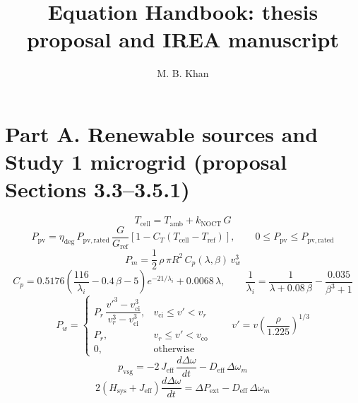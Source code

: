 \documentclass[11pt]{article}
\title{Equation Handbook: thesis proposal and IREA manuscript}
\author{M. B. Khan}
\date{}
\begin{document}
\maketitle
\section*{Part A. Renewable sources and Study 1 microgrid (proposal Sections 3.3--3.5.1)}
\begin{equation}
T_{\mathrm{cell}} = T_{\mathrm{amb}} + k_{\mathrm{NOCT}}\,G \tag{3.1}
\end{equation}
\begin{equation}
P_{\mathrm{pv}} = \eta_{\mathrm{deg}}\,P_{\mathrm{pv,rated}}\,\frac{G}{G_{\mathrm{ref}}}\left[1 - C_T\left(T_{\mathrm{cell}} - T_{\mathrm{ref}}\right)\right], \qquad 0 \le P_{\mathrm{pv}} \le P_{\mathrm{pv,rated}} \tag{3.2}
\end{equation}
\begin{equation}
P_m = \frac{1}{2}\,\rho\,\pi R^{2}\,C_p(\lambda,\beta)\,v_w^{3} \tag{3.3}
\end{equation}
\begin{equation}
C_p = 0.5176\left(\frac{116}{\lambda_i} - 0.4\,\beta - 5\right)e^{-21/\lambda_i} + 0.0068\,\lambda, \qquad \frac{1}{\lambda_i} = \frac{1}{\lambda + 0.08\,\beta} - \frac{0.035}{\beta^{3} + 1} \tag{3.4}
\end{equation}
\begin{equation}
P_w = \begin{cases} P_r\,\dfrac{v'^{3} - v_{\mathrm{ci}}^{3}}{v_r^{3} - v_{\mathrm{ci}}^{3}}, & v_{\mathrm{ci}} \le v' < v_r \\ P_r, & v_r \le v' < v_{\mathrm{co}} \\ 0, & \text{otherwise} \end{cases} \qquad v' = v\left(\frac{\rho}{1.225}\right)^{1/3} \tag{3.5}
\end{equation}
\begin{equation}
p_{\mathrm{vsg}} = -2\,J_{\mathrm{eff}}\,\frac{d\Delta\omega}{dt} - D_{\mathrm{eff}}\,\Delta\omega_m \tag{3.6}
\end{equation}
\begin{equation}
2\left(H_{\mathrm{sys}} + J_{\mathrm{eff}}\right)\frac{d\Delta\omega}{dt} = \Delta P_{\mathrm{ext}} - D_{\mathrm{eff}}\,\Delta\omega_m \tag{3.7}
\end{equation}
\end{document}
